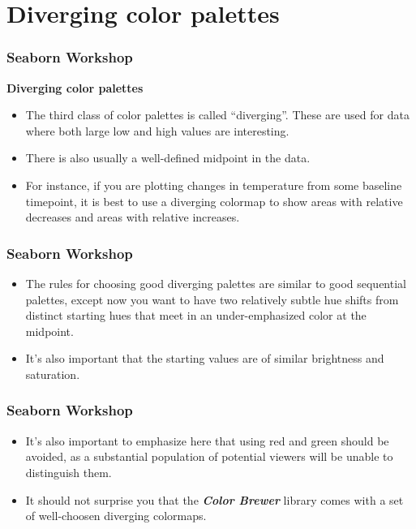 \documentclass{beamer}
\begin{document}
\section{Diverging color palettes}
\begin{frame}[fragile]
\frametitle{Seaborn Workshop}
\large

\noindent \textbf{Diverging color palettes}
\begin{itemize}
\item The third class of color palettes is called “diverging”. These are used for data where both large low and high values are interesting. 
\item There is also usually a well-defined midpoint in the data. 
\item For instance, if you are plotting changes in temperature from some baseline timepoint, it is best to use a diverging colormap to show areas with relative decreases and areas with relative increases.
\end{itemize}
\end{frame}
\begin{frame}[fragile]
	\frametitle{Seaborn Workshop}
	\large
	\begin{itemize}
		\item The rules for choosing good diverging palettes are similar to good sequential palettes, except now you want to have two relatively subtle hue shifts from distinct starting hues that meet in an under-emphasized color at the midpoint. \item It’s also important that the starting values are of similar brightness and saturation.
		\end{itemize}
\end{frame}
\begin{frame}[fragile]
	\frametitle{Seaborn Workshop}
	\large
\begin{itemize}
\item It’s also important to emphasize here that using red and green should be avoided, as a substantial population of potential viewers will be unable to distinguish them.
\item 
It should not surprise you that the \textbf{\textit{Color Brewer}} library comes with a set of well-choosen diverging colormaps.
\end{itemize}

\end{frame}
\end{document}
